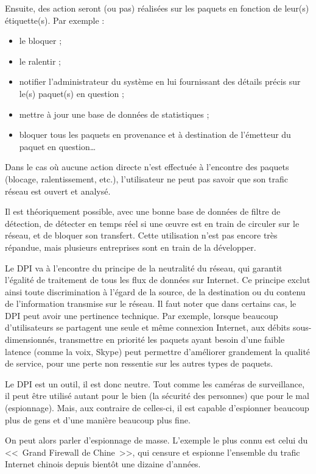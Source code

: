 Ensuite, des action seront (ou pas) réalisées sur les paquets en fonction de leur(s) étiquette(s).
Par exemple :

\begin{itemize}
\item le bloquer ;
\item le ralentir ;
\item notifier l'administrateur du système en lui fournissant des détails précis sur le(s) paquet(s) en question ;
\item mettre à jour une base de données de statistiques ;
\item bloquer tous les paquets en provenance et à destination de l'émetteur du paquet en question\dots{}
\end{itemize}

Dans le cas où aucune action directe n'est effectuée à l'encontre des paquets (blocage, ralentissement, etc.), l'utilisateur ne peut pas savoir que son trafic réseau est ouvert et analysé.

Il est théoriquement possible, avec une bonne base de données de filtre de détection, de détecter en temps réel si une œuvre est en train de circuler sur le réseau, et de bloquer son transfert.
Cette utilisation n'est pas encore très répandue, mais plusieurs entreprises sont en train de la développer.

Le DPI va à l'encontre du principe de la neutralité du réseau, qui garantit l'égalité de traitement de tous les flux de données sur Internet.
Ce principe exclut ainsi toute discrimination à l'égard de la source, de la destination ou du contenu de l'information transmise sur le réseau.
Il faut noter que dans certains cas, le DPI peut avoir une pertinence technique.
Par exemple, lorsque beaucoup d'utilisateurs se partagent une seule et même connexion Internet, aux débits sous-dimensionnés, transmettre en priorité les paquets ayant besoin d'une faible latence (comme la voix, Skype) peut permettre d'améliorer grandement la qualité de service, pour une perte non ressentie sur les autres types de paquets.

Le DPI est un outil, il est donc neutre.
Tout comme les caméras de surveillance, il peut être utilisé autant pour le bien (la sécurité des personnes) que pour le mal (espionnage).
Mais, aux contraire de celles-ci, il est capable d'espionner beaucoup plus de gens et d'une manière beaucoup plus fine.

On peut alors parler d'espionnage de masse.
L'exemple le plus connu est celui du <<~Grand Firewall de Chine~>>, qui censure et espionne l'ensemble du trafic Internet chinois depuis bientôt une dizaine d'années.

